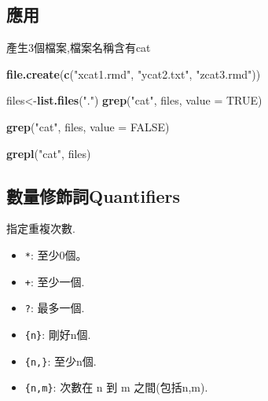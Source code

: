 \documentclass[]{book}
\newenvironment{Shaded}{\begin{snugshade}}{\end{snugshade}}
\newcommand{\KeywordTok}[1]{\textcolor[rgb]{0.13,0.29,0.53}{\textbf{#1}}}
\newcommand{\DataTypeTok}[1]{\textcolor[rgb]{0.13,0.29,0.53}{#1}}
\newcommand{\StringTok}[1]{\textcolor[rgb]{0.31,0.60,0.02}{#1}}
\newcommand{\OtherTok}[1]{\textcolor[rgb]{0.56,0.35,0.01}{#1}}
\newcommand{\NormalTok}[1]{#1}
\providecommand{\tightlist}{%
  \setlength{\itemsep}{0pt}\setlength{\parskip}{0pt}}
\theoremstyle{definition}
\theoremstyle{definition}
\theoremstyle{definition}
\theoremstyle{remark}
\begin{document}
\subsection{應用}

產生3個檔案,檔案名稱含有cat

\begin{Shaded}
\begin{Highlighting}[]
\KeywordTok{file.create}\NormalTok{(}\KeywordTok{c}\NormalTok{(}\StringTok{"xcat1.rmd"}\NormalTok{, }\StringTok{"ycat2.txt"}\NormalTok{, }\StringTok{"zcat3.rmd"}\NormalTok{))}
\end{Highlighting}
\end{Shaded}

\begin{Shaded}
\begin{Highlighting}[]
\NormalTok{files<-}\KeywordTok{list.files}\NormalTok{(}\StringTok{"."}\NormalTok{)}
\KeywordTok{grep}\NormalTok{(}\StringTok{"cat"}\NormalTok{, files, }\DataTypeTok{value =} \OtherTok{TRUE}\NormalTok{)}
\end{Highlighting}
\end{Shaded}

\begin{Shaded}
\begin{Highlighting}[]
\KeywordTok{grep}\NormalTok{(}\StringTok{"cat"}\NormalTok{, files, }\DataTypeTok{value =} \OtherTok{FALSE}\NormalTok{)}
\end{Highlighting}
\end{Shaded}

\begin{Shaded}
\begin{Highlighting}[]
\KeywordTok{grepl}\NormalTok{(}\StringTok{"cat"}\NormalTok{, files)}
\end{Highlighting}
\end{Shaded}

\subsection{數量修飾詞Quantifiers}\label{quantifiers}

指定重複次數.

\begin{itemize}
\tightlist
\item
  \texttt{*}: 至少0個。\\
\item
  \texttt{+}: 至少一個.\\
\item
  \texttt{?}: 最多一個.\\
\item
  \texttt{\{n\}}: 剛好n個.\\
\item
  \texttt{\{n,\}}: 至少n個.\\
\item
  \texttt{\{n,m\}}: 次數在 n 到 m 之間(包括n,m).
\end{itemize}
\end{document}
